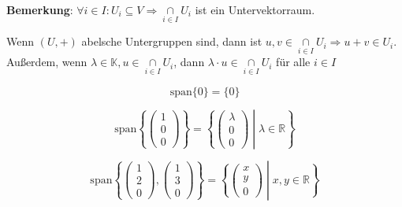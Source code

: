 \documentclass{article}
\begin{document}
\textbf{Bemerkung}: $\forall i \in I \colon U_i \subseteq V \Rightarrow \underset{i \in I}{\cap} U_i$ ist ein Untervektorraum.

Wenn $(U, +)$ abelsche Untergruppen sind, dann ist $u,v \in \underset{i \in I}{\cap} U_i \Rightarrow u + v \in U_i$.
Außerdem, wenn $\lambda \in \mathbb{K}, u \in \underset{i \in I}{\cap} U_i$, dann $\lambda \cdot u \in \underset{i \in I}{\cap} U_i$
für alle $i \in I$

\[
  \text{span} \{ 0 \} = \{ 0 \}
\]

\[
  \text{span} \left\{\begin{pmatrix}1\\0\\0\end{pmatrix}\right\} =
  \left\{ \begin{pmatrix}\lambda\\0\\0\end{pmatrix} \middle| \lambda \in \mathbb{R} \right\}
\]

\[
  \text{span} \left\{\begin{pmatrix}1\\2\\0\end{pmatrix},\begin{pmatrix}1\\3\\0\end{pmatrix}\right\} =
  \left\{ \begin{pmatrix}x\\y\\0\end{pmatrix} \middle| x, y \in \mathbb{R} \right\}
\]
\end{document}

